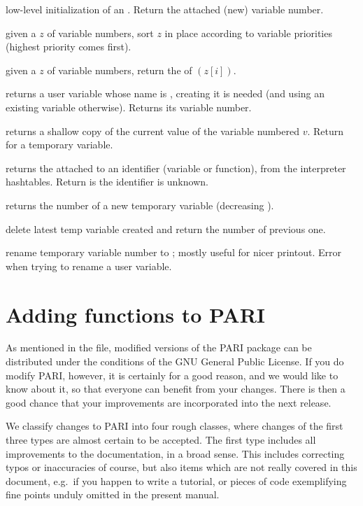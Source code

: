  low-level initialization of an
. Return the attached (new) variable number.

 given a  $z$ of variable
numbers, sort $z$ in place according to variable priorities (highest priority
comes first).

 given a  $z$ of variable numbers,
return the  of $(z[i])$.


 returns a user variable whose name
is , creating it is needed (and using an existing variable otherwise).
Returns its variable number.

 returns a shallow copy of the
current value of the variable numbered $v$. Return  for a temporary
variable.

 returns the  attached
to an identifier  (variable or function), from the interpreter
hashtables. Return  is the identifier is unknown.


 returns the number of a new temporary variable
(decreasing ).

 delete latest temp variable created and return
the number of previous one.

 rename temporary variable number
 to ; mostly useful for nicer printout. Error when trying to
rename a user variable.

\section{Adding functions to PARI}
%
As mentioned in the  file, modified versions of the PARI package
can be distributed under the conditions of the GNU General Public License. If
you do modify PARI, however, it is certainly for a good reason, and we
would like to know about it, so that everyone can benefit from your changes.
There is then a good chance that your improvements are incorporated into the
next release.

We classify changes to PARI into four rough classes, where changes of the
first three types are almost certain to be accepted. The first type includes
all improvements to the documentation, in a broad sense. This includes
correcting typos or inaccuracies of course, but also items which are not
really covered in this document, e.g.~if you happen to write a tutorial,
or pieces of code exemplifying fine points unduly omitted in the present
manual.

